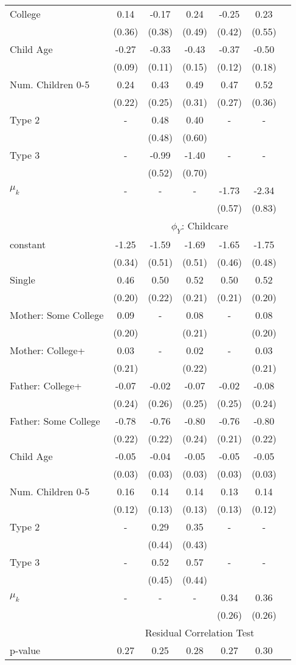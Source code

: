 \begin{tabular}{lcccccc}
College&0.14&-0.17&0.24&-0.25&0.23&\\&(0.36)&(0.38)&(0.49)&(0.42)&(0.55)&\\Child Age&-0.27&-0.33&-0.43&-0.37&-0.50&\\&(0.09)&(0.11)&(0.15)&(0.12)&(0.18)&\\Num. Children 0-5&0.24&0.43&0.49&0.47&0.52&\\&(0.22)&(0.25)&(0.31)&(0.27)&(0.36)&\\Type 2&-&0.48&0.40&-&-&\\&&(0.48)&(0.60)&&&\\Type 3&-&-0.99&-1.40&-&-&\\&&(0.52)&(0.70)&&&\\$\mu_{k}$&-&-&-&-1.73&-2.34&\\&&&&(0.57)&(0.83)&\\& \multicolumn{6}{c}{$\phi_{Y}$: Childcare}\\\cmidrule(r){2-7}constant&-1.25&-1.59&-1.69&-1.65&-1.75&\\&(0.34)&(0.51)&(0.51)&(0.46)&(0.48)&\\Single&0.46&0.50&0.52&0.50&0.52&\\&(0.20)&(0.22)&(0.21)&(0.21)&(0.20)&\\Mother: Some College&0.09&-&0.08&-&0.08&\\&(0.20)&&(0.21)&&(0.20)&\\Mother: College+&0.03&-&0.02&-&0.03&\\&(0.21)&&(0.22)&&(0.21)&\\Father: College+&-0.07&-0.02&-0.07&-0.02&-0.08&\\&(0.24)&(0.26)&(0.25)&(0.25)&(0.24)&\\Father: Some College&-0.78&-0.76&-0.80&-0.76&-0.80&\\&(0.22)&(0.22)&(0.24)&(0.21)&(0.22)&\\Child Age&-0.05&-0.04&-0.05&-0.05&-0.05&\\&(0.03)&(0.03)&(0.03)&(0.03)&(0.03)&\\Num. Children 0-5&0.16&0.14&0.14&0.13&0.14&\\&(0.12)&(0.13)&(0.13)&(0.13)&(0.12)&\\Type 2&-&0.29&0.35&-&-&\\&&(0.44)&(0.43)&&&\\Type 3&-&0.52&0.57&-&-&\\&&(0.45)&(0.44)&&&\\$\mu_{k}$&-&-&-&0.34&0.36&\\&&&&(0.26)&(0.26)&\\& \multicolumn{6}{c}{Residual Correlation Test}\\\cmidrule(r){2-7}p-value&0.27&0.25&0.28&0.27&0.30&\\
\bottomrule\end{tabular}